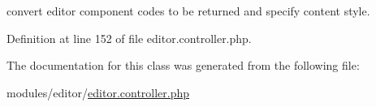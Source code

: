 convert editor component codes to be returned and specify content style. 



Definition at line 152 of file editor.\+controller.\+php.



The documentation for this class was generated from the following file\+:\begin{DoxyCompactItemize}
\item 
modules/editor/\hyperlink{editor_8controller_8php}{editor.\+controller.\+php}\end{DoxyCompactItemize}
